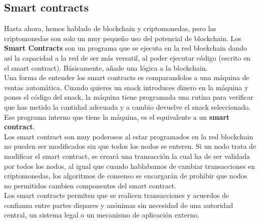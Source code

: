 \subsection{Smart contracts}

Hasta ahora, hemos hablado de blockchain y criptomonedas, pero las criptomonedas son solo un muy pequeño uso del potencial de blockchain. Los \textbf{Smart Contracts}\cite{etherSmartContract} son un programa que se ejecuta en la red blockchain dando así la capacidad a la red de ser más versatil, al poder ejecutar código (escrito en el smart contract). Básicamente, añade una lógica a la blockchain. \\

Una forma de entender los smart contracts es comparandolos a una máquina de ventas automática. Cuando quieres un snack introduces dinero en la máquina y pones el código del snack, la máquina tiene programada una rutina para verificar que has metido la cantidad adecuada y a cambio devuelve el snack seleccionado. Ese programa interno que tiene la máquina, es el equivalente a un \textbf{smart contract}. \\

Los smart contract son muy poderosos al estar programados en la red blockchain no pueden ser modificados sin que todos los nodos se enteren. Si un nodo trata de modificar el smart contract, se creará una transacción la cual ha de ser validada por todos los nodos, al igual que cuando hablabamos de cambiar transacciones en criptomonedas, los algoritmos de consenso se encargarán de prohibir que nodos no permitidos cambien componentes del smart contract. \\

Los smart contracts permiten que se realicen transacciones y acuerdos de confianza entre partes dispares y anónimas sin necesidad de una autoridad central, un sistema legal o un mecanismo de aplicación externo. \\

\label{sec:smartContract}

